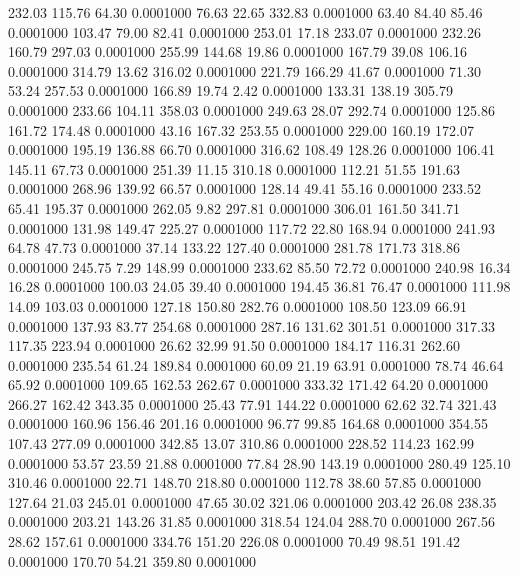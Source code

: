  232.03  115.76   64.30   0.0001000
  76.63   22.65  332.83   0.0001000
  63.40   84.40   85.46   0.0001000
 103.47   79.00   82.41   0.0001000
 253.01   17.18  233.07   0.0001000
 232.26  160.79  297.03   0.0001000
 255.99  144.68   19.86   0.0001000
 167.79   39.08  106.16   0.0001000
 314.79   13.62  316.02   0.0001000
 221.79  166.29   41.67   0.0001000
  71.30   53.24  257.53   0.0001000
 166.89   19.74    2.42   0.0001000
 133.31  138.19  305.79   0.0001000
 233.66  104.11  358.03   0.0001000
 249.63   28.07  292.74   0.0001000
 125.86  161.72  174.48   0.0001000
  43.16  167.32  253.55   0.0001000
 229.00  160.19  172.07   0.0001000
 195.19  136.88   66.70   0.0001000
 316.62  108.49  128.26   0.0001000
 106.41  145.11   67.73   0.0001000
 251.39   11.15  310.18   0.0001000
 112.21   51.55  191.63   0.0001000
 268.96  139.92   66.57   0.0001000
 128.14   49.41   55.16   0.0001000
 233.52   65.41  195.37   0.0001000
 262.05    9.82  297.81   0.0001000
 306.01  161.50  341.71   0.0001000
 131.98  149.47  225.27   0.0001000
 117.72   22.80  168.94   0.0001000
 241.93   64.78   47.73   0.0001000
  37.14  133.22  127.40   0.0001000
 281.78  171.73  318.86   0.0001000
 245.75    7.29  148.99   0.0001000
 233.62   85.50   72.72   0.0001000
 240.98   16.34   16.28   0.0001000
 100.03   24.05   39.40   0.0001000
 194.45   36.81   76.47   0.0001000
 111.98   14.09  103.03   0.0001000
 127.18  150.80  282.76   0.0001000
 108.50  123.09   66.91   0.0001000
 137.93   83.77  254.68   0.0001000
 287.16  131.62  301.51   0.0001000
 317.33  117.35  223.94   0.0001000
  26.62   32.99   91.50   0.0001000
 184.17  116.31  262.60   0.0001000
 235.54   61.24  189.84   0.0001000
  60.09   21.19   63.91   0.0001000
  78.74   46.64   65.92   0.0001000
 109.65  162.53  262.67   0.0001000
 333.32  171.42   64.20   0.0001000
 266.27  162.42  343.35   0.0001000
  25.43   77.91  144.22   0.0001000
  62.62   32.74  321.43   0.0001000
 160.96  156.46  201.16   0.0001000
  96.77   99.85  164.68   0.0001000
 354.55  107.43  277.09   0.0001000
 342.85   13.07  310.86   0.0001000
 228.52  114.23  162.99   0.0001000
  53.57   23.59   21.88   0.0001000
  77.84   28.90  143.19   0.0001000
 280.49  125.10  310.46   0.0001000
  22.71  148.70  218.80   0.0001000
 112.78   38.60   57.85   0.0001000
 127.64   21.03  245.01   0.0001000
  47.65   30.02  321.06   0.0001000
 203.42   26.08  238.35   0.0001000
 203.21  143.26   31.85   0.0001000
 318.54  124.04  288.70   0.0001000
 267.56   28.62  157.61   0.0001000
 334.76  151.20  226.08   0.0001000
  70.49   98.51  191.42   0.0001000
 170.70   54.21  359.80   0.0001000
